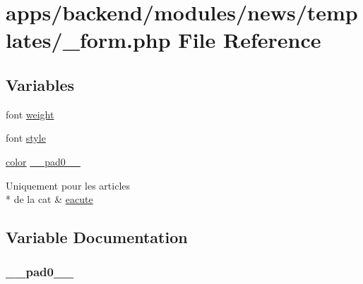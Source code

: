 \hypertarget{backend_2modules_2news_2templates_2__form_8php}{\section{apps/backend/modules/news/templates/\-\_\-form.php File Reference}
\label{backend_2modules_2news_2templates_2__form_8php}
}
\subsection*{Variables}
\begin{DoxyCompactItemize}
\item 
font \hyperlink{backend_2modules_2news_2templates_2__form_8php_a9b9780cce21a0de7f2a4efdab697bc39}{weight}
\item 
font \hyperlink{backend_2modules_2news_2templates_2__form_8php_a8ba9b58991c02462588258e164fe3f84}{style}
\item 
\hyperlink{preview_success_8php_ac04e2a463631b69c8f70784275a056d6}{color} \hyperlink{backend_2modules_2news_2templates_2__form_8php_a82281c80e5a34da73d7f831c14a3514a}{\-\_\-\-\_\-pad0\-\_\-\-\_\-}
\item 
Uniquement pour les articles \\*
de la cat \& \hyperlink{backend_2modules_2news_2templates_2__form_8php_a5cb19caf4ca71c9a14632775d9bd5015}{eacute}
\end{DoxyCompactItemize}


\subsection{Variable Documentation}
\hypertarget{backend_2modules_2news_2templates_2__form_8php_a82281c80e5a34da73d7f831c14a3514a}{
\subsubsection[{\-\_\-\-\_\-pad0\-\_\-\-\_\-}]{ \-\_\-\-\_\-pad0\-\_\-\-\_\-}}\label{backend_2modules_2news_2templates_2__form_8php_a82281c80e5a34da73d7f831c14a3514a}


